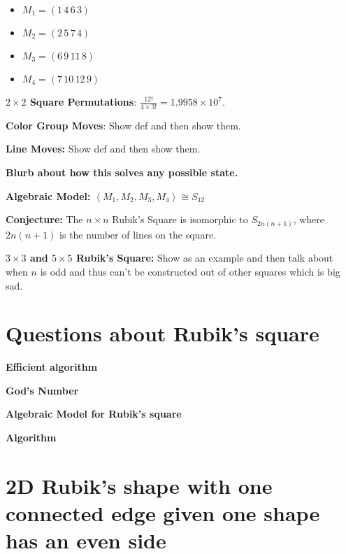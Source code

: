 \documentclass{article}
\begin{document}
\begin{itemize}
    \item $M_1 = (1\,4\,6\,3)$
    \item $M_2 = (2\,5\,7\,4)$
    \item $M_3 = (6\,9\,11\,8)$
    \item $M_4 = (7\,10\,12\,9)$
\end{itemize}

\textbf{$2\times 2$ Square Permutations}: $\frac{12!}{4 \times 3!} = 1.9958\times10^7$.

\textbf{Color Group Moves}: Show def and then show them.

\textbf{Line Moves:} Show def and then show them.

\textbf{Blurb about how this solves any possible state.}

\textbf{Algebraic Model:} $\left<M_1, M_2, M_3, M_4\right> \cong S_{12}$

\textbf{Conjecture:} The $n \times n$ Rubik's Square is isomorphic to $S_{2n(n+1)}$, where $2n(n+1)$ is the number of lines on the square.

\textbf{$3 \times 3$ and $5 \times 5$ Rubik's Square:} Show as an example and then talk about when $n$ is odd and thus can't be constructed out of other squares which is big sad.

\section{Questions about Rubik's square}

\textbf{Efficient algorithm}

\textbf{God's Number}

\textbf{Algebraic Model for Rubik's square}

\textbf{Algorithm}

\section{2D Rubik's shape with one connected edge given one shape has an even side}
\end{document}
